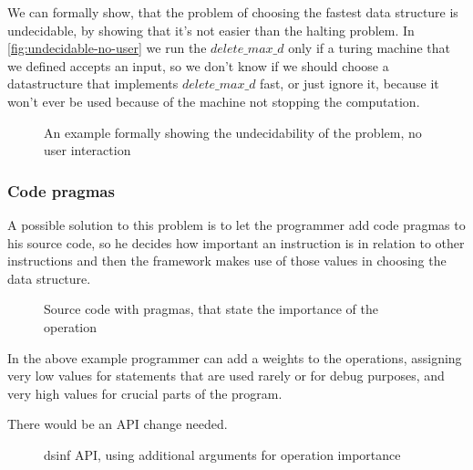 \documentclass[a4paper,11pt]{article}
\begin{document}
        We can formally show, that the problem of choosing the fastest data structure is undecidable, by showing that
        it's not easier than the halting problem. In \autoref{fig:undecidable-no-user} we run the $delete\_max\_d$ only
        if a turing machine that we defined accepts an input, so we don't know if we should choose a datastructure that
        implements $delete\_max\_d$ fast, or just ignore it, because it won't ever be used because of the machine not
        stopping the computation.

        \begin{figure}
			

			\caption{An example formally showing the undecidability of the problem, no user interaction}

			\label{fig:undecidable-no-user}
		\end{figure}

		\subsubsection{Code pragmas} \label{sec:pragmas}

			A possible solution to this problem is to let the programmer add code pragmas to his source
			code, so he decides how important an instruction is in relation to other instructions and then
			the framework makes use of those values in choosing the data structure.

			\begin{figure}
				

				\caption{Source code with pragmas, that state the importance of the operation}

				\label{fig:code-pragmas}
			\end{figure}

			In the above example programmer can add a weights to the operations, assigning very low values
			for statements that are used rarely or for debug purposes, and very high values for crucial
			parts of the program.

			There would be an API change needed.

			\begin{figure}
				

				\caption{dsinf API, using additional arguments for operation importance}

				\label{fig:code-pragmas-api}
			\end{figure}
\end{document}
